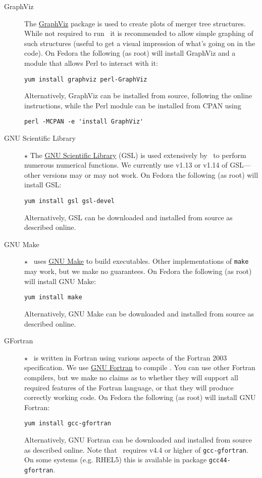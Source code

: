 \begin{description}
\item[GraphViz] The \href{http://www.graphviz.org/}{GraphViz} package is used to create plots of merger tree structures. While not required to run \glc\ it is recommended to allow simple graphing of such structures (useful to get a visual impression of what's going on in the code). On Fedora the following (as root) will install GraphViz and a module that allows Perl to interact with it:
\begin{verbatim}
yum install graphviz perl-GraphViz
\end{verbatim}
Alternatively, GraphViz can be installed from source, following the online instructions, while the Perl module can be installed from CPAN using
\begin{verbatim}
perl -MCPAN -e 'install GraphViz'
\end{verbatim}

 \item [GNU Scientific Library] $\star$ The \href{http://www.gnu.org/software/gsl/}{GNU Scientific Library} (GSL) is used extensively by \glc\ to perform numerous numerical functions. We currently use v1.13 or v1.14 of GSL---other versions may or may not work. On Fedora the following (as root) will install GSL:
\begin{verbatim}
yum install gsl gsl-devel
\end{verbatim}
Alternatively, GSL can be downloaded and installed from source as described online.

 \item [GNU Make] $\star$ \glc\ uses \href{http://www.gnu.org/software/make/}{GNU Make} to build executables. Other implementations of {\tt make} may work, but we make no guarantees. On Fedora the following (as root) will install GNU Make:
\begin{verbatim}
yum install make
\end{verbatim}
Alternatively, GNU Make can be downloaded and installed from source as described online.

 \item [GFortran] $\star$ \glc\ is written in Fortran using various aspects of the Fortran 2003 specification. We use \href{http://gcc.gnu.org/fortran/}{GNU Fortran} to compile \glc. You can use other Fortran compilers, but we make no claims as to whether they will support all required features of the Fortran language, or that they will produce correctly working code. On Fedora the following (as root) will install GNU Fortran:
\begin{verbatim}
yum install gcc-gfortran
\end{verbatim}
Alternatively, GNU Fortran can be downloaded and installed from source as described online. Note that \glc\ requires v4.4 or higher of {\tt gcc-gfortran}. On some systems (e.g. RHEL5) this is available in package {\tt gcc44-gfortran}.


\end{description}
